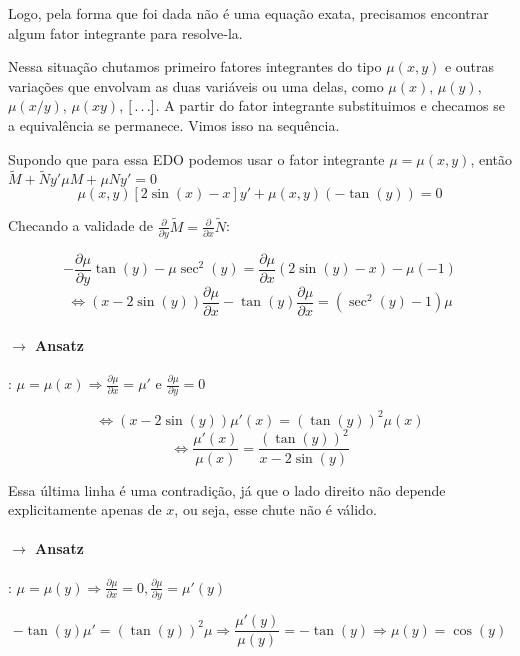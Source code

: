      Logo, pela forma que foi dada não é uma equação exata, precisamos encontrar algum fator
     integrante para resolve-la.
     
     Nessa situação chutamos primeiro fatores integrantes do tipo \( \mu(x, y) \) e outras variações
     que envolvam as duas variáveis ou uma delas, como \( \mu(x) \), \( \mu(y) \), \( \mu(x/y) \), \(
     \mu(xy) \), \( [\reflectbox{$\dots$}] \). A partir do fator integrante substituimos e checamos se
     a equivalência se permanece. Vimos isso na sequência.


     Supondo que para essa EDO podemos usar o fator integrante \( \mu = \mu(x, y) \), então
     \( \widetilde{M} + \widetilde{N} y'   \mu M + \mu N y' = 0 \) 
     \[ \mu(x, y) \left[ 2 \sin (x) - x \right]y' + \mu(x, y) (-\tan(y)) = 0 \]
     
     Checando a validade de \( \frac{\partial }{\partial y} \widetilde{M}  = \frac{\partial }{\partial x} \widetilde{N}\):
     
     
     \[ - \frac{\partial \mu}{\partial y} \tan(y) - \mu \sec^2 (y) = \frac{\partial \mu}{\partial x} \left( 2 \sin (y) - x \right) - \mu (-1) \]
     \[ \Leftrightarrow \left( x - 2 \sin(y) \right) \frac{\partial \mu}{\partial x} - \tan(y) \frac{\partial \mu}{\partial x} = (\sec^2 (y) - 1) \mu  \]
     
     \paragraph{$\rightarrow $ Ansatz}: \( \mu = \mu(x)\Rightarrow \frac{\partial \mu}{\partial x} = \mu' \)  e \( \frac{\partial \mu}{\partial y} = 0 \) 
     
     \[ \Leftrightarrow (x - 2\sin(y)) \mu'(x) = \left( \tan(y) \right)^2 \mu(x) \]
     \[ \Leftrightarrow \frac{\mu'(x)}{\mu(x)} = \frac{ \left( \tan(y) \right)^2 }{x - 2 \sin(y)} \]

     Essa última linha é uma contradição, já que o lado direito não depende explicitamente apenas de
     \( x \), ou seja, esse chute não é válido.
     

     \paragraph{$\rightarrow $ Ansatz}: \( \mu = \mu(y) \Rightarrow \frac{\partial \mu}{\partial x}  = 0, \frac{\partial \mu}{\partial y} = \mu'(y)\) 

     \[ - \tan(y) \mu' = \left( \tan(y) \right)^2 \mu \Rightarrow \frac{\mu'(y)}{\mu(y)}= - \tan(y) \Rightarrow \mu(y) = \cos(y)\]




